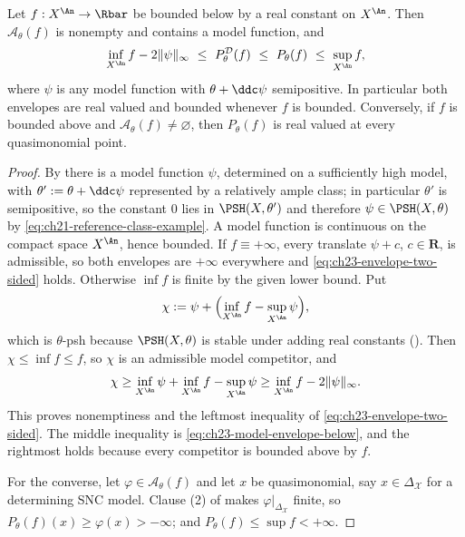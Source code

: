 \begin{lemma}\label{lem:ch23-envelope-finiteness}
Let $f:X^{\An}\to\Rbar$ be bounded below by a real constant on $X^{\An}$.
Then $\mathcal A_\theta(f)$ is nonempty and contains a model function, and
\begin{equation}\label{eq:ch23-envelope-two-sided}
 \inf_{X^{\An}}f-2\|\psi\|_\infty
 \ \leq\ P^{\mathcal D}_\theta(f)
 \ \leq\ P_\theta(f)\ \leq\ \sup_{X^{\An}}f ,
\end{equation}
where $\psi$ is any model function with $\theta+\ddc\psi$ semipositive.
In particular both envelopes are real valued and bounded whenever $f$ is
bounded.  Conversely, if $f$ is bounded above and
$\mathcal A_\theta(f)\ne\varnothing$, then $P_\theta(f)$ is real valued
at every quasimonomial point.
\end{lemma}

\begin{proof}
By  there is a model function
$\psi$, determined on a sufficiently high model, with
$\theta':=\theta+\ddc\psi$ represented by a relatively ample class; in
particular $\theta'$ is semipositive, so the constant $0$ lies in
$\PSH(X,\theta')$ and therefore $\psi\in\PSH(X,\theta)$ by
\eqref{eq:ch21-reference-class-example}.  A model function is continuous on
the compact space $X^{\An}$, hence bounded.  If $f\equiv+\infty$, every
translate $\psi+c$, $c\in\mathbf R$, is admissible, so both envelopes
are $+\infty$ everywhere and \eqref{eq:ch23-envelope-two-sided} holds.
Otherwise $\inf f$ is finite by the given lower bound.  Put
\[
 \chi:=\psi+\Bigl(\inf_{X^{\An}}f-\sup_{X^{\An}}\psi\Bigr),
\]
which is $\theta$-psh because $\PSH(X,\theta)$ is stable under adding
real constants ().  Then
$\chi\leq\inf f\leq f$, so $\chi$ is an admissible model competitor, and
\[
 \chi\geq\inf_{X^{\An}}\psi+\inf_{X^{\An}}f-\sup_{X^{\An}}\psi
 \geq\inf_{X^{\An}}f-2\|\psi\|_\infty .
\]
This proves nonemptiness and the leftmost
inequality of \eqref{eq:ch23-envelope-two-sided}.  The middle inequality is
\eqref{eq:ch23-model-envelope-below}, and the rightmost holds because every
competitor is bounded above by $f$.

For the converse, let $\varphi\in\mathcal A_\theta(f)$ and let $x$ be
quasimonomial, say $x\in\Delta_{\mathcal X}$ for a determining SNC model.
Clause (2) of  makes
$\varphi|_{\Delta_{\mathcal X}}$ finite, so
$P_\theta(f)(x)\geq\varphi(x)>-\infty$; and $P_\theta(f)\leq\sup f<+\infty$.
\end{proof}

